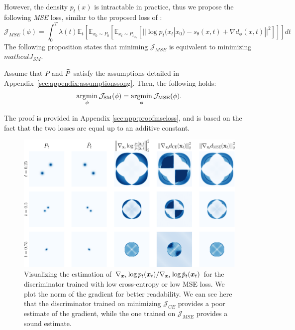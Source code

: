 However, the density $p_{t}(x)$ is intractable in practice, thus we propose the following \textit{MSE} loss, similar to the proposed loss of \citep{vincent_connection_2011,song2021scorebasedgenerativemodelingstochastic} :
\begin{equation}\label{eq:refinement_mse}
    \mathcal{J}_{MSE}(\phi) = \int_{0}^{T} \lambda(t) \mathbb{E}_{{t}}\left[ \mathbb{E}_{x_{0}\sim P_{0}} \left[ \mathbb{E}_{x_{t}  \sim P_{t}_{|x_{0}}} \left[  || \log p_{t}(x_{t}|x_{0}) -  s_{\theta}(x,t) + \nabla d_{\phi}(x,t) ||^{2} \right] \right] \right] dt
\end{equation}
The following proposition states that miniming $\mathcal{J}_{MSE}$ is equivalent to minimizing $mathcal{J}_{SM}$. 
\begin{proposition}\label{theorem:optimality_mse_sm}
    Assume that $P$ and $\widetilde P$ satisfy the assumptions detailed in Appendix~\ref{sec:appendix:assumptionssong}.
    Then, the following holds:
    \begin{equation}
        \operatorname*{argmin}_\phi \mathcal{J}_{\mathrm{SM}}(\phi) = \operatorname*{argmin}_\phi \mathcal{J}_{\mathrm{MSE}}(\phi).
    \end{equation}
\end{proposition}
\begin{hproof}
The proof is provided in Appendix \ref{sec:app:proofmseloss}, and is based on the fact that the two losses are equal up to an additive constant.
\end{hproof}
\begin{figure}[t]
    \centering
    \includegraphics[width=\textwidth]{gfx/gradients_wrt_ts.pdf}
    \caption{Visualizing the estimation of $\nabla_{\boldsymbol{x}_{t}} \log p_{t}(\boldsymbol{x}_{t})/\nabla_{\boldsymbol{x}_{t}} \log \hat{p}_{t}(\boldsymbol{x}_{t})$ for the discriminator trained with low cross-entropy or low MSE loss. We plot the norm of the gradient for better readability. We can see here that the discriminator trained on minimizing $\mathcal{J}_{CE}$ provides a poor estimate of the gradient, while the one trained on $\mathcal{J}_{MSE}$ provides a sound estimate.}
    \label{fig:2d_gradient}
\end{figure}
